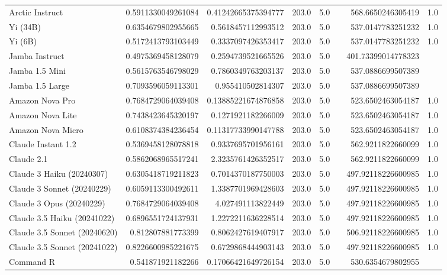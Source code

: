 \begin{table}[htp]
{\begin{tabular}{lrrrrrrr}
Arctic Instruct & 0.5911330049261084 & 0.41242665375394777 & 203.0 & 5.0 &  & 568.6650246305419 & 1.0 \\
Yi (34B) & 0.6354679802955665 & 0.5618457112993512 & 203.0 & 5.0 &  & 537.0147783251232 & 1.0 \\
Yi (6B) & 0.5172413793103449 & 0.3337097426353417 & 203.0 & 5.0 &  & 537.0147783251232 & 1.0 \\
Jamba Instruct & 0.4975369458128079 & 0.2594739521665526 & 203.0 & 5.0 &  & 401.73399014778323 &  \\
Jamba 1.5 Mini & 0.5615763546798029 & 0.7860349763203137 & 203.0 & 5.0 &  & 537.0886699507389 &  \\
Jamba 1.5 Large & 0.7093596059113301 & 0.955410502814307 & 203.0 & 5.0 &  & 537.0886699507389 &  \\
Amazon Nova Pro & 0.7684729064039408 & 0.13885221674876858 & 203.0 & 5.0 &  & 523.6502463054187 & 1.0 \\
Amazon Nova Lite & 0.7438423645320197 & 0.1271921182266009 & 203.0 & 5.0 &  & 523.6502463054187 & 1.0 \\
Amazon Nova Micro & 0.6108374384236454 & 0.11317733990147788 & 203.0 & 5.0 &  & 523.6502463054187 & 1.0 \\
Claude Instant 1.2 & 0.5369458128078818 & 0.9337695701956161 & 203.0 & 5.0 &  & 562.9211822660099 & 1.0 \\
Claude 2.1 & 0.5862068965517241 & 2.3235761426352517 & 203.0 & 5.0 &  & 562.9211822660099 & 1.0 \\
Claude 3 Haiku (20240307) & 0.6305418719211823 & 0.7014370187750003 & 203.0 & 5.0 &  & 497.92118226600985 & 1.0 \\
Claude 3 Sonnet (20240229) & 0.6059113300492611 & 1.3387701969428603 & 203.0 & 5.0 &  & 497.92118226600985 & 1.0 \\
Claude 3 Opus (20240229) & 0.7684729064039408 & 4.027491113822449 & 203.0 & 5.0 &  & 497.92118226600985 & 1.0 \\
Claude 3.5 Haiku (20241022) & 0.6896551724137931 & 1.2272211636228514 & 203.0 & 5.0 &  & 497.92118226600985 & 1.0 \\
Claude 3.5 Sonnet (20240620) & 0.812807881773399 & 0.8062427619407917 & 203.0 & 5.0 &  & 506.92118226600985 & 1.0 \\
Claude 3.5 Sonnet (20241022) & 0.8226600985221675 & 0.6729868444903143 & 203.0 & 5.0 &  & 497.92118226600985 & 1.0 \\
Command R & 0.541871921182266 & 0.17066421649726154 & 203.0 & 5.0 &  & 530.6354679802955 &  \\

\end{tabular}}
\end{table}
